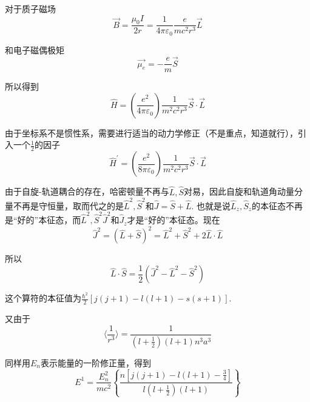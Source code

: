 \documentclass[UTF8]{ctexart}
\begin{document}
\noindent 对于质子磁场
\begin{equation}
    \vec{B} = \frac{\mu_0 I}{2r} = \frac{1}{4 \pi \varepsilon_0} \frac{e}{mc^2 r^3} \vec{L}
\end{equation}

\noindent 和电子磁偶极矩
\begin{equation}
    \vec{\mu_e} = - \frac{e}{m} \vec{S}
\end{equation}

\noindent 所以得到 
\begin{equation}
    \hat{H} = \left(\frac{e^2}{4 \pi \varepsilon_0}\right) \frac{1}{m^2 c^2 r^3} \vec{S} \cdot \vec{L}
\end{equation}

    由于坐标系不是惯性系，需要进行适当的动力学修正（不是重点，知道就行），引入一个$\frac{1}{2}$的因子
    \begin{equation}
        \hat{H}^{\prime} = \left(\frac{e^2}{8 \pi \varepsilon_0}\right) \frac{1}{m^2 c^2 r^3} \vec{S} \cdot \vec{L}
    \end{equation}

    由于自旋-轨道耦合的存在，哈密顿量不再与$\hat{L},\hat{S}$对易，因此自旋和轨道角动量分量不再是守恒量，取而代之的是$\hat{L}^2,\hat{S}^2$和$\hat{J} = \hat{S} + \hat{L}$. 也就是说$\hat{L}_z,\hat{S}_z$的本征态不再是“好的”本征态，而$\hat{L}^2,\hat{S}^2 \hat{J}^2$和$\hat{J}_z$才是“好的”本征态。现在
    \begin{equation}
        \hat{J}^2 = (\hat{L}+ \hat{S})^2 = \hat{L}^2 + \hat{S}^2 + 2 \hat{L} \cdot \hat{L}
    \end{equation}

\noindent 所以 
\begin{equation}
    \hat{L} \cdot \hat{S} = \frac{1}{2} (\hat{J}^2 - \hat{L}^2 - \hat{S}^2)
\end{equation}

\noindent 这个算符的本征值为$\frac{\hbar^2}{2} \left[j(j+1) - l(l+1) - s(s+1)\right]$.

    又由于 
    \begin{equation}
        \langle \frac{1}{r^3} \rangle = \frac{1}{\left(l+\frac{1}{2}\right)(l+1)n^3 a^3} 
    \end{equation}

\noindent 同样用$E_n$表示能量的一阶修正量，得到
\begin{equation}
    E^{1}=\frac{E_{n}^{2}}{m c^{2}}\left\{\frac{n\left[j(j+1)-l(l+1)-\frac{3}{4}\right]}{l\left(l+\frac{1}{2}\right)(l+1)}\right\}
\end{equation}
\end{document}
